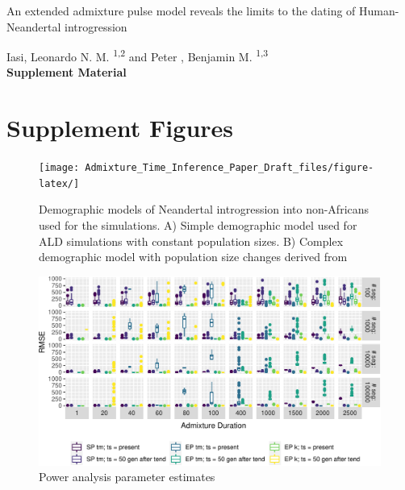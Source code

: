 \documentclass[11pt]{article}
\begin{document}
\begin{titlepage}


    \vspace*{1cm}
        
        
    \begin{center}       
        \large
        \vspace{1cm}
        An extended admixture pulse model reveals the limits to the dating of Human-Neandertal introgression
        
       \vspace{1.0cm}
        \large
        Iasi, Leonardo N. M. \textsuperscript{1,2} and Peter , Benjamin M. \textsuperscript{1,3} \\ 
        
        \vspace{1.0cm}
            \Huge
            \textbf{Supplement Material}
    \end{center} 

            

\end{titlepage}

\section{Supplement Figures}

\begin{figure}
\centering
\texttt{[image: Admixture\_Time\_Inference\_Paper\_Draft\_files/figure-latex/]}
\caption{\label{fig:figS1} Demographic models of Neandertal introgression into non-Africans used for the simulations. A) Simple demographic model used for ALD simulations with constant population sizes. B) Complex demographic model with population size changes derived from \cite{skov_detecting_2018}}
\end{figure}

\begin{figure}
\centering
\includegraphics{ATE_Revisions_files/figure-latex/figR1_error_ests-1.pdf}
\caption{\label{fig:figR1_error_ests} Power analysis parameter estimates}
\end{figure}
\end{document}
